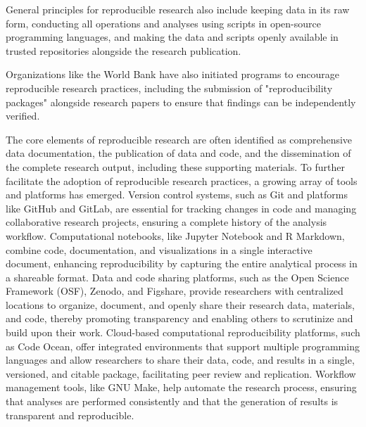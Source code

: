 \documentclass{article}
\begin{document}
General principles for reproducible research also include keeping data in its raw form, conducting all operations and analyses using scripts in open-source programming languages, and making the data and scripts openly available in trusted repositories alongside the research publication.

Organizations like the World Bank have also initiated programs to encourage reproducible research practices, including the submission of "reproducibility packages" alongside research papers to ensure that findings can be independently verified.

The core elements of reproducible research are often identified as comprehensive data documentation, the publication of data and code, and the dissemination of the complete research output, including these supporting materials. To further facilitate the adoption of reproducible research practices, a growing array of tools and platforms has emerged. Version control systems, such as Git and platforms like GitHub and GitLab, are essential for tracking changes in code and managing collaborative research projects, ensuring a complete history of the analysis workflow. Computational notebooks, like Jupyter Notebook and R Markdown, combine code, documentation, and visualizations in a single interactive document, enhancing reproducibility by capturing the entire analytical process in a shareable format. Data and code sharing platforms, such as the Open Science Framework (OSF), Zenodo, and Figshare, provide researchers with centralized locations to organize, document, and openly share their research data, materials, and code, thereby promoting transparency and enabling others to scrutinize and build upon their work. Cloud-based computational reproducibility platforms, such as Code Ocean, offer integrated environments that support multiple programming languages and allow researchers to share their data, code, and results in a single, versioned, and citable package, facilitating peer review and replication. Workflow management tools, like GNU Make, help automate the research process, ensuring that analyses are performed consistently and that the generation of results is transparent and reproducible.
\end{document}
